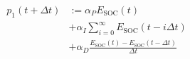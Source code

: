 \begin{equation}
\begin{split}
	p_1(t+\Delta t) &:= \alpha_P E_\text{SOC}(t)\\
	&+ \alpha_I \sum_{i=0}^\infty E_\text{SOC}(t-i\Delta t)\\
	&+ \alpha_D \frac{E_\text{SOC}(t)-E_\text{SOC}(t-\Delta t)}{\Delta t}
\end{split}
\label{ch2:equ:corrective-component-soc}
\end{equation}